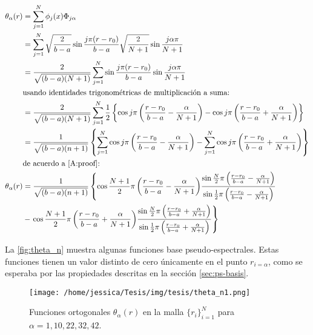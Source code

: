 \begin{align}
  \theta_{\alpha}(r) & = \sum_{j=1}^{N}\phi_j(x)\Phi_{j\alpha} \label{eq:trash9}\\
    & = \sum_{j=1}^{N} \sqrt{\frac{2}{b-a}}\sin{\frac{j\pi(r-r_0)}{b-a}}\sqrt{\frac{2}{N+1}} \sin{\frac{j\alpha \pi}{N+1}} \label{eq:trash10}\\
                     & = \frac{2}{\sqrt{(b-a)(N+1)}}\sum_{j=1}^{N}\sin{\frac{j\pi(r-r_0)}{b-a}}\sin{\frac{j\alpha \pi}{N+1}} \label{eq:trash11} \\
  & \text{usando identidades trigonométricas de multiplicación a suma:} \nonumber \\
    & = \frac{2}{\sqrt{(b-a)(N+1)}}\sum_{j=1}^{N} \frac{1}{2}\left\{
\cos{j\pi \left(\frac{r-r_0}{b-a} - \frac{\alpha}{N+1}\right)} 
-
\cos{j\pi \left(\frac{r-r_0}{b-a} + \frac{\alpha}{N+1}\right)}
\right\} \label{eq:trash11} \\
& = \frac{1}{\sqrt{(b-a)(n+1)}} \left\{
\sum_{j=1}^{N}
\cos{j\pi \left(\frac{r-r_0}{b-a} - \frac{\alpha}{N+1}\right)} 
-
\sum_{j=1}^{N}
\cos{j\pi \left(\frac{r-r_0}{b-a} + \frac{\alpha}{N+1}\right)}
                                 \right\} \label{eq:trash12} \\
   & \text{de acuerdo a \autoref{A:proof}:} \nonumber \\
\theta_{\alpha}(r) & = \frac{1}{\sqrt{(b-a)(n+1)}} \left\{
\cos{\frac{N+1}{2} \pi \left(\frac{r-r_0}{b-a} - \frac{\alpha}{N+1}\right) }
\frac{\sin{\frac{N}{2}}\pi \left(\frac{r-r_0}{b-a} - \frac{\alpha}{N+1}\right)}{\sin\frac{1}{2}\pi \left(\frac{r-r_0}{b-a} - \frac{\alpha}{N+1}\right)} \right. \nonumber \\
&-
\left. \cos{\frac{N+1}{2} \pi \left(\frac{r-r_0}{b-a} + \frac{\alpha}{N+1}\right) }
\frac{\sin{\frac{N}{2}}\pi \left(\frac{r-r_0}{b-a} + \frac{\alpha}{N+1}\right)}{\sin\frac{1}{2}\pi \left(\frac{r-r_0}{b-a} + \frac{\alpha}{N+1}\right)}\right\} \label{eq:trash13}
\end{align}

La \autoref{fig:theta_n} muestra algunas funciones base pseudo-espectrales. Estas funciones tienen un valor distinto de cero únicamente en el punto $r_{i=\alpha}$, como se esperaba por las propiedades descritas en la sección \autoref{sec:ps-basis}.

\begin{figure}[ht]
  \centering
  \texttt{[image: /home/jessica/Tesis/img/tesis/theta\_n1.png]}
  \caption{Funciones ortogonales $\theta_{\alpha}(r)$ en la malla $\{r_i\}_{i=1}^{N}$ para $\alpha=1,10,22,32,42$.}
  \label{fig:theta_n}
\end{figure}

